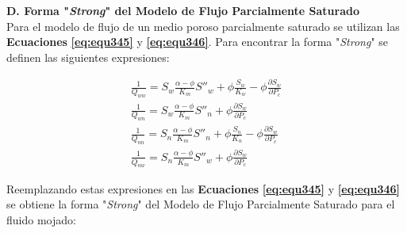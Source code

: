 \vspace{1cm}
\textbf{D. Forma "\textit{Strong}" del Modelo de Flujo Parcialmente Saturado}\\
 Para el modelo de flujo de un medio poroso parcialmente saturado se utilizan las \textbf{Ecuaciones} \textbf{\ref{eq:equ345}} y \textbf{\ref{eq:equ346}}. Para encontrar la forma "\textit{Strong}" se definen las siguientes expresiones:\bigskip
 
\begin{ceqn} 
\begin{subequations} \label{eq:equ394} 
\begin{gather}
\frac{1}{Q_{ww}} = S_w \frac{\alpha - \phi}{K_m}S''_w + \phi\frac{S_w}{K_w} - \phi\frac{\partial S_w}{\partial P_c} \label{eq:equ394a}\\[10pt]
\frac{1}{Q_{wn}} = S_w \frac{\alpha - \phi}{K_m}S''_n + \phi\frac{\partial S_w}{\partial P_c} \label{eq:equ394b}\\[10pt]
\frac{1}{Q_{nn}} = S_n \frac{\alpha - \phi}{K_m}S''_n + \phi\frac{S_n}{K_n} - \phi\frac{\partial S_w}{\partial P_c} \label{eq:equ394c}\\[10pt]
\frac{1}{Q_{nw}} = S_n \frac{\alpha - \phi}{K_m}S''_w + \phi\frac{\partial S_w}{\partial P_c} \label{eq:equ394d}
\end{gather}  
\end{subequations} 
\end{ceqn}

Reemplazando estas expresiones en las \textbf{Ecuaciones} \textbf{\ref{eq:equ345}} y \textbf{\ref{eq:equ346}} se obtiene la forma "\textit{Strong}" del Modelo de Flujo Parcialmente Saturado para el fluido mojado:


